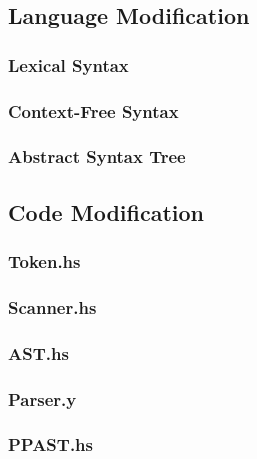 \documentclass[12pt]{article}
\begin{document}
\subsection{Language Modification}
\subsubsection{Lexical Syntax}
\subsubsection{Context-Free Syntax}
\subsubsection{Abstract Syntax Tree}

\subsection{Code Modification}
\subsubsection{Token.hs}
\subsubsection{Scanner.hs}
\subsubsection{AST.hs}
\subsubsection{Parser.y}
\subsubsection{PPAST.hs}
\fi
\end{document}
